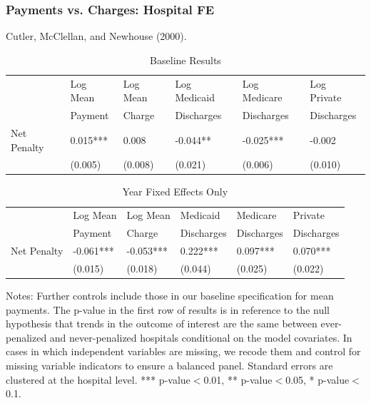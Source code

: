 \documentclass[ucs,9pt]{beamer}
\begin{document}
\begin{frame}
\frametitle{Payments vs. Charges: Hospital FE}
Cutler, McClellan, and Newhouse (2000).
\begin{table}[htp]
\centering \normalsize
\caption{Baseline Results}
\label{tab:samplemort}
\footnotesize
\begin{tabular}{llllll}
\hline	
 & Log Mean		& Log Mean		& Log Medicaid 	   	& Log Medicare   		& Log Private  			\\
	& Payment		& 	Charge		& Discharges      		& Discharges       		& Discharges        	\\
\hline
Net Penalty  	&	0.015***	&	0.008	&	-0.044**	&	-0.025***	&	-0.002	\\
	&	(0.005)	&	(0.008)	&	(0.021)	&	(0.006)	&	(0.010)	\\
\hline
\end{tabular}
\end{table}






\begin{table}[htp]
\centering \normalsize
\caption{Year Fixed Effects Only}
\footnotesize
\begin{tabular}{llllll}
\hline	
\hline
 			& Log Mean 		& Log Mean	& Medicaid 	   	& Medicare   		& Private  			\\
			& Payment		& 	Charge	& Discharges      	& Discharges       	& Discharges    \\
\hline											
Net Penalty	&	-0.061***	&	-0.053***	&	0.222***	&	0.097***	&	0.070***	\\
	&	(0.015)	&	(0.018)	&	(0.044)	&	(0.025)	&	(0.022)	\\
\end{tabular}
\end{table}
\tiny Notes: Further controls include those in our baseline specification for mean payments.  The p-value in the first row of results is in reference to the null hypothesis that trends in the outcome of interest are the same between ever-penalized and never-penalized hospitals conditional on the model covariates.  In cases in which independent variables are missing, we recode them and control for missing variable indicators to ensure a balanced panel.  Standard errors are clustered at the hospital level.  *** p-value$<$0.01, ** p-value$<$0.05, * p-value$<$0.1.
\end{frame}
\end{document}
